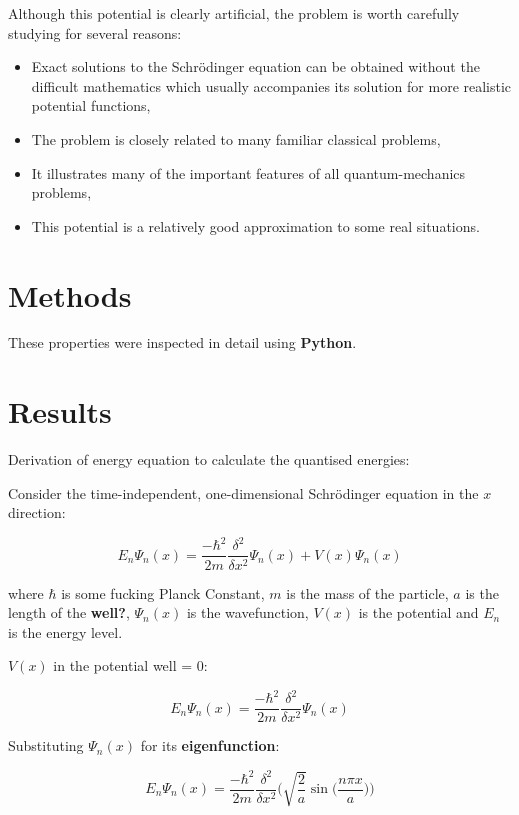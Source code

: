 Although this potential is clearly artificial, the problem is worth carefully studying for several reasons: 
\begin{itemize}
    \item Exact solutions to the Schrödinger equation can be obtained without the difficult mathematics which usually accompanies its solution for more realistic potential functions,
    \item The problem is closely related to many familiar classical problems,
    \item It illustrates many of the important features of all quantum-mechanics problems,
    \item This potential is a relatively good approximation to some real situations.
\end{itemize}

\section{Methods}
   
These properties were inspected in detail using \textbf{Python}.
   
\section{Results}

Derivation of energy equation to calculate the quantised energies:

Consider the time-independent, one-dimensional Schrödinger equation in the $x$ direction:

$$E_n \Psi_n (x) = \frac{-\hbar ^{2}}{2m}\frac{\delta^{2}}{\delta x^{2}}\Psi_n (x) + V(x)\Psi_n (x)$$

where $\hbar$ is some fucking Planck Constant, $m$ is the mass of the particle, $a$ is the length of the \textbf{well?}, $\Psi_n (x)$ is the wavefunction, $V(x)$ is the potential and $E_n$ is the energy level. 

$V(x)$ in the potential well = 0: 

\begin{equation} \label{eq:1}
E_n \Psi_n (x) = \frac{-\hbar ^{2}}{2m}\frac{\delta^{2}}{\delta x^{2}}\Psi_n (x)
\end{equation}


Substituting $\Psi_n (x)$ for its \textbf{eigenfunction}:

$$E_n \Psi_n (x) = \frac{-\hbar ^{2}}{2m}\frac{\delta^{2}}{\delta x^{2}}\Bigg(\sqrt{\frac{2}{a}}\sin\Big(\frac{n\pi x}{a}\Big)\Bigg)$$

